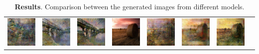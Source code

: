 \documentclass[10pt,twocolumn,letterpaper]{article}
\begin{document}
\begin{table}
\begin{tabular}{c c c c | c c c c}
		\includegraphics[width=5em]{2605_leo.jpg} & 
		\includegraphics[width=5em]{2605_gen.jpg} &
		\includegraphics[width=5em]{2605_unet.jpg} &
		\includegraphics[width=5em]{6476_real.jpg}& 
		\includegraphics[width=5em]{6476_leo.jpg} & 
		\includegraphics[width=5em]{6476_gen.jpg} &
		\includegraphics[width=5em]{6476_unet.jpg} \\
	\end{tabular}
	\caption{\textbf{Results}. Comparison between the generated images from different models.}
	\label{table:results}
\end{table}
\end{document}
